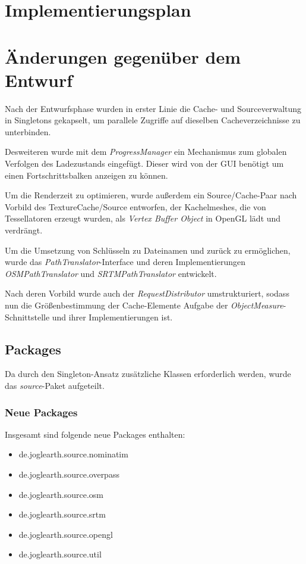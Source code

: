 \documentclass[10pt]{scrreprt}
\begin{document}
\chapter{Implementierungsplan}




\chapter{Änderungen gegenüber dem Entwurf}

Nach der Entwurfsphase wurden in erster Linie die Cache- und Sourceverwaltung in Singletons gekapselt, um parallele Zugriffe auf dieselben Cacheverzeichnisse zu unterbinden.

Desweiteren wurde mit dem \textit{ProgressManager} ein Mechanismus zum globalen Verfolgen des Ladezustands eingefügt. Dieser wird von der GUI benötigt um einen Fortschrittsbalken anzeigen zu können.

Um die Renderzeit zu optimieren, wurde außerdem ein Source/Cache-Paar nach Vorbild des TextureCache/Source entworfen, der Kachelmeshes, die von Tessellatoren erzeugt wurden, als \textit{Vertex Buffer Object} in OpenGL lädt und verdrängt.

Um die Umsetzung von Schlüsseln zu Dateinamen und zurück zu ermöglichen, wurde das \textit{PathTranslator}-Interface und deren Implementierungen \textit{OSMPathTranslator} und \textit{SRTMPathTranslator} entwickelt. 

Nach deren Vorbild wurde auch der \textit{RequestDistributor} umstrukturiert, sodass nun die Größenbestimmung der Cache-Elemente Aufgabe der \textit{ObjectMeasure}-Schnittstelle und ihrer Implementierungen ist.

\section{Packages}

Da durch den Singleton-Ansatz zusätzliche Klassen erforderlich werden, wurde das \textit{source}-Paket aufgeteilt. 

\subsection*{Neue Packages}
Insgesamt sind folgende neue Packages enthalten:
\begin{itemize}
\item de.joglearth.source.nominatim
\item de.joglearth.source.overpass
\item de.joglearth.source.osm
\item de.joglearth.source.srtm
\item de.joglearth.source.opengl
\item de.joglearth.source.util
\end{itemize}
\end{document}
